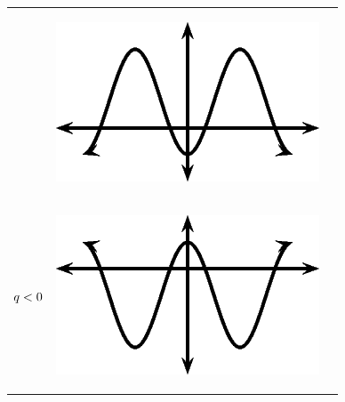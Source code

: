 \begin{center}
\begin{xtabular*}{\mytablewidth}[t]{|p{10\mystarwidth}|p{10\mystarwidth}|p{10\mystarwidth}|}
                 &
    \setcounter{subfigure}{0}
\label{m39414*id88196}
    \begin{center}
    \label{m39414*id88196!!!underscore!!!media}\label{m39414*id88196!!!underscore!!!printimage}\includegraphics{col11306.imgs/m39414_MG10C15_027.png} %
      \vspace{2pt}
    \vspace{.1in}
    \end{center}    
     \tabularnewline{}
                  $q<{}0$
                 &
    \setcounter{subfigure}{0}
\label{m39414*id88234}
    \begin{center}
    \label{m39414*id88234!!!underscore!!!media}\label{m39414*id88234!!!underscore!!!printimage}\includegraphics{col11306.imgs/m39414_MG10C15_028.png} %
      \vspace{2pt}
    \vspace{.1in}

\end{center}
\end{xtabular*}
\end{center}
